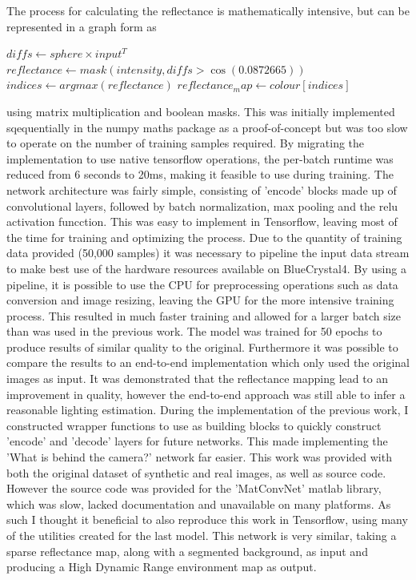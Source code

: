\documentclass[ %
                    author={Gavin Parker},
                supervisor={Dr. Neill Campbell},
                    degree={MEng},
                     title={Deep Siamese Networks for Illumination Estimation from Stereo Images},
                  subtitle={},
                      type={research},
                      year={2018} ]{dissertation}
\begin{document}
\newline
The process for calculating the reflectance is mathematically intensive, but can be represented in a graph form as
\begin{algorithm}
$ diffs \leftarrow sphere \times input^T $\;
$ reflectance \leftarrow mask(intensity, diffs > \cos(0.0872665)) $\;
$ indices \leftarrow argmax(reflectance) $\;
$ reflectance_map \leftarrow colour[indices] $\;
\end{algorithm}
using matrix multiplication and boolean masks. This was initially implemented sqequentially in the numpy maths package as a proof-of-concept but was too slow to operate on the number of training samples required. By migrating the implementation to use native tensorflow operations, the per-batch runtime was reduced from 6 seconds to 20ms, making it feasible to use during training.
\newline
The network architecture was fairly simple, consisting of 'encode' blocks made up of convolutional layers, followed by batch normalization, max pooling and the relu activation funcction. This was easy to implement in Tensorflow, leaving most of the time for training and optimizing the process. Due to the quantity of training data provided (50,000 samples) it was necessary to pipeline the input data stream to make best use of the hardware resources available on BlueCrystal4. By using a pipeline, it is possible to use the CPU for preprocessing operations such as data conversion and image resizing, leaving the GPU for the more intensive training process. This resulted in much faster training and allowed for a larger batch size than was used in the previous work. The model was trained for 50 epochs to produce results of similar quality to the original. Furthermore it was possible to compare the results to an end-to-end implementation which only used the original images as input. It was demonstrated that the reflectance mapping lead to an improvement in quality, however the end-to-end approach was still able to infer a reasonable lighting estimation.
\newline
During the implementation of the previous work, I constructed wrapper functions to use as building blocks to quickly construct 'encode' and 'decode' layers for future networks. This made implementing the 'What is behind the camera?' network far easier. This work was provided with both the original dataset of synthetic and real images, as well as source code. However the source code was provided for the 'MatConvNet' matlab library, which was slow, lacked documentation and unavailable on many platforms. As such I thought it beneficial to also reproduce this work in Tensorflow, using many of the utilities created for the last model. This network is very similar, taking a sparse reflectance map, along with a segmented background, as input and producing a High Dynamic Range environment map as output.
\end{document}
